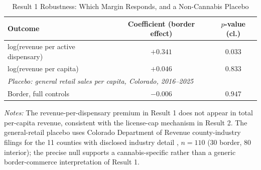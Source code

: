 \begin{table}[htbp]
\centering
\caption{Result 1 Robustness: Which Margin Responds, and a Non-Cannabis Placebo}
\label{tab:result1_placebo}
\small
\begin{tabular}{p{7.4cm}cc}
\toprule
Outcome & Coefficient (border effect) & $p$-value (cl.) \\
\midrule
log(revenue per active dispensary) & $+0.341$ & $0.033$ \\
log(revenue per capita) & $+0.046$ & $0.833$ \\
\midrule
\multicolumn{3}{l}{\textit{Placebo: general retail sales per capita, Colorado, 2016--2025}} \\
Border, full controls & $-0.006$ & $0.947$ \\
\bottomrule
\end{tabular}
\begin{minipage}{0.95\textwidth}
\vspace{0.3em}
\footnotesize
\textit{Notes:} The revenue-per-dispensary premium in Result 1 does not appear in total per-capita revenue,
consistent with the license-cap mechanism in Result 2. The general-retail placebo uses Colorado Department
of Revenue county-industry filings for the 11 counties with disclosed industry detail
\citep{CDORRetailByCounty}, $n=110$ (30 border, 80 interior); the precise null supports a cannabis-specific
rather than a generic border-commerce interpretation of Result 1.
\end{minipage}
\end{table}
